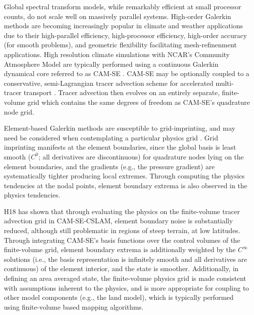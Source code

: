 \documentclass{agujournal}
\begin{document}
Global spectral transform models, while remarkably efficient at small processor counts, do not scale well on massively parallel systems. High-order Galerkin methods are becoming increasingly popular in climate and weather applications due to their high-parallel efficiency, high-processor efficiency, high-order accuracy (for smooth problems), and geometric flexibility facilitating mesh-refinenment applications. High resolution climate simulations with NCAR's Community Atmosphere Model \citep[CAM;][]{CAM5} are typically performed using a continuous Galerkin dynamical core referred to as CAM-SE \citep[CAM Spectral Elements;][]{TES2008JPCS,DetAl2012IJHPCA,LetAl2018JAMES}. CAM-SE may be optionally coupled to a conservative, semi-Lagrangian tracer advection scheme for accelerated multi-tracer transport \citep[CAM-SE-CSLAM;][]{LTOUNGK2017MWR}. Tracer advection then evolves on an entirely separate, finite-volume grid which contains the same degrees of freedom as CAM-SE's quadrature node grid.

Element-based Galerkin methods are susceptible to grid-imprinting, and may need be considered when contemplating a particular physics grid \citep[][hereafter referred to as H18]{HL2018MWR}. Grid imprinting manifests at the element boundaries, since the global basis is least smooth ($C^{0}$; all derivatives are discontinuous) for quadrature nodes lying on the element boundaries, and the gradients (e.g., the pressure gradient) are systematically tighter producing local extremes. Through computing the physics tendencies at the nodal points, element boundary extrema is also observed in the physics tendencies. 

H18 has shown that through evaluating the physics on the finite-volume tracer advection grid in CAM-SE-CSLAM, element boundary noise is substantially reduced, although still problematic in regions of steep terrain, at low latitudes. Through integrating CAM-SE's basis functions over the control volumes of the finite-volume grid, element boundary extrema is additionally weighted by the $C^{\infty}$ solutions (i.e., the basis representation is infinitely smooth and all derivatives are continuous) of the element interior, and the state is smoother. Additionally, in defining an area averaged state, the finite-volume physics grid is made consistent with assumptions inherent to the physics, and is more appropriate for coupling to other model components (e.g., the land model), which is typically performed using finite-volume based mapping algorithms.
\end{document}
